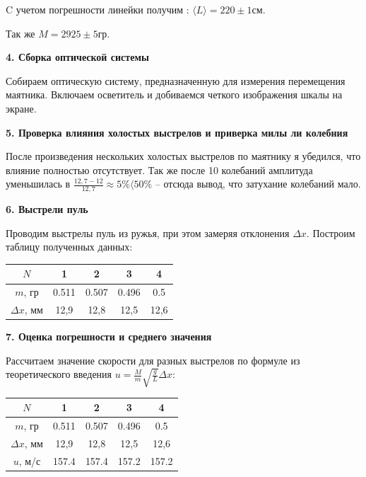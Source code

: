 \documentclass[a4paper,12pt]{article} %
\begin{document}
C учетом погрешности линейки получим : $\langle L\rangle = 220 \pm 1 \textbf{см}$. 

Так же $M = 2925 \pm 5 $гр.

\begin{center}
{\bf 4. Сборка оптической системы}
\end{center}

Собираем оптическую систему, предназначенную для измерения перемещения маятника. Включаем осветитель и добиваемся четкого изображения шкалы на экране.

\begin{center}
{\bf 5. Проверка влияния холостых выстрелов и приверка милы ли колебния}
\end{center}

После произведения нескольких холостых выстрелов по маятнику я убедился, что влияние полностью отсутствует. Так же после 10 колебаний амплитуда уменьшилась в $\frac{12,7 - 12}{12,7} \approx 5\% \langle 50\% $ -- отсюда вывод, что затухание колебаний мало.
\newpage
\begin{center}
{\bf 6. Выстрели пуль}
\end{center}

Проводим выстрелы пуль из ружья, при этом замеряя отклонения $\Delta x$. Построим таблицу полученных данных:

\begin{center}
\begin{tabular}{|c|c|c|c|c|}
\hline 
$N$ & 1 & 2 & 3 & 4 \\ 
\hline 
$m$, гр & 0.511 & 0.507 & 0.496 & 0.5 \\ 
\hline 
$\Delta x$, мм & 12,9 & 12,8 & 12,5 & 12,6 \\ 
\hline 
\end{tabular} 
\end{center}

\begin{center}
{\bf 7. Оценка погрешности и среднего значения}
\end{center}

Рассчитаем значение скорости для разных выстрелов по формуле из теоретического введения $u = \frac{M}{m}\sqrt{\frac{g}{L}}\Delta x$:

\begin{center}
\begin{tabular}{|c|c|c|c|c|}
\hline 
$N$ & 1 & 2 & 3 & 4 \\ 
\hline 
$m$, гр & 0.511 & 0.507 & 0.496 & 0.5 \\ 
\hline 
$\Delta x$, мм & 12,9 & 12,8 & 12,5 & 12,6 \\ 
\hline 
$u$, м/с  & 157.4 & 157.4 & 157.2 & 157.2 \\ 
\hline
\end{tabular} 
\end{center}
\end{document}
